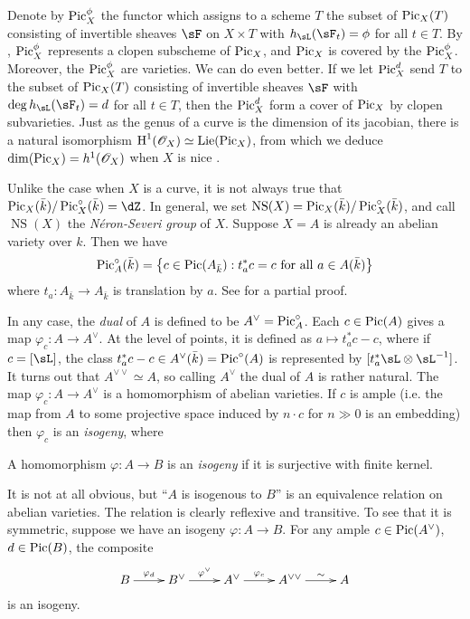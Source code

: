\documentclass{article}
\begin{document}
Denote by 
$\operatorname{Pic}_X^\phi$ the functor which assigns to a scheme $T$ the subset of 
$\operatorname{Pic}_X(T)$ consisting of invertible sheaves $\sF$ on $X\times T$ with 
$h_\sL(\sF_t) = \phi$ for all $t\in T$. By \cite[6.20]{kl05}, 
$\operatorname{Pic}_X^\phi$ represents a clopen subscheme of $\operatorname{Pic}_X$, and $\operatorname{Pic}_X$ is 
covered by the $\operatorname{Pic}_X^\phi$. Moreover, the $\operatorname{Pic}_X^\phi$ are varieties. We can 
do even better. If we let $\operatorname{Pic}_X^d$ send $T$ to the subset of $\operatorname{Pic}_X(T)$ 
consisting of invertible sheaves $\sF$ with 
$\deg h_\sL(\sF_t) = d$ for all $t\in T$, then the 
$\operatorname{Pic}_X^d$ form a cover of $\operatorname{Pic}_X$ by clopen subvarieties. Just as the genus 
of a curve is the dimension of its jacobian, there is a natural isomorphism 
$\operatorname{H}^1(\mathscr{O}_X) \simeq \operatorname{Lie}(\operatorname{Pic}_X)$, from which we deduce 
$\dim(\operatorname{Pic}_X) = h^1(\mathscr{O}_X)$ when $X$ is nice \cite[5.11]{kl05}.

Unlike the case when $X$ is a curve, it is not always true that 
$\picard_X(\bar k)/\picard_X^\circ(\bar k) = \dZ$. In general, we set 
$\operatorname{NS}(X) = \operatorname{Pic}_X(\bar k) / \operatorname{Pic}_X^\circ(\bar k)$, and call 
$\operatorname{NS}(X)$ the \emph{N\'eron-Severi group} of $X$. 
Suppose $X=A$ is already an abelian variety over $k$. Then we have 
\[
  \operatorname{Pic}_A^\circ(\bar k) = \left\{c\in \operatorname{Pic}(A_{\bar k}) : t_a^* c = c\text{ for all }a\in A(\bar k)\right\} 
\]
where $t_a:A_{\bar k}\to A_{\bar k}$ is translation by $a$. See 
\cite[I.8.4]{mi} for a partial proof. 


In any case, the \emph{dual} of $A$ is defined to be $A^\vee = \operatorname{Pic}_A^\circ$. 
Each $c\in \operatorname{Pic}(A)$ gives a map $\varphi_c:A\to A^\vee$. At the level of 
points, it is defined as $a\mapsto t_a^* c - c$, where if $c=[\sL]$, 
the class $t_a^*c - c\in A^\vee(\bar k) = \operatorname{Pic}^\circ(A)$ is represented by 
$[t_a^*\sL\otimes\sL^{-1}]$. 
It turns out that $A^{\vee\vee} \simeq A$, so calling $A^\vee$ the dual of $A$ 
is rather natural. The map $\varphi_c:A\to A^\vee$ is a homomorphism of abelian 
varieties. If $c$ is ample (i.e. the map from $A$ to some projective space 
induced by $n\cdot c$ for $n\gg 0$ is an embedding) then $\varphi_c$ is an 
\emph{isogeny}, where 

\begin{definition}
A homomorphism $\varphi:A\to B$ is an \emph{isogeny} if it is surjective with 
finite kernel.
\end{definition}

It is not at all obvious, but ``$A$ is isogenous to $B$'' is an equivalence 
relation on abelian varieties. The relation is clearly reflexive and 
transitive. To see that it is symmetric, suppose we have an 
isogeny $\varphi:A\to B$. For any ample $c\in \operatorname{Pic}(A^\vee)$, $d\in \operatorname{Pic}(B)$, 
the composite 
\[\xymatrix{
  B \ar[r]^-{\varphi_d} 
    & B^\vee \ar[r]^-{\varphi^\vee} 
    & A^\vee \ar[r]^-{\varphi_c}
    & A^{\vee\vee} \ar[r]^-\sim 
    & A
}\]
is an isogeny. 
\end{document}
